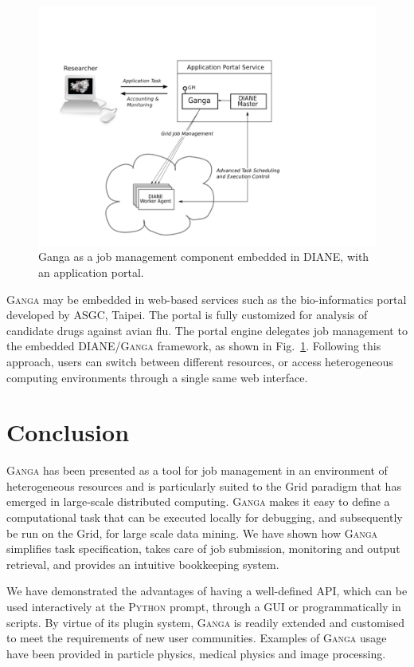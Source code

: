 \documentclass{elsart}
\def\ganga {\textsc{Ganga}\xspace}
\def\python {\textsc{Python}\xspace}
\def\diane {\textsc{DIANE}\xspace}
\def\grid {Grid\xspace}
\begin{document}
\begin{figure}[h!]
  \centering
  \includegraphics[width=1 \textwidth]{ganga-diane-portal}
  \caption{Ganga as a job management component embedded in \diane,
    with an application portal.}
  \label{fig:webportal}
\end{figure}
\ganga may be embedded in web-based services such as the
bio-informatics portal developed by ASGC, Taipei. The portal is fully
customized for analysis of candidate drugs against avian flu.  The portal
engine delegates
job management to the embedded \diane/\ganga framework, as shown in
Fig.~\ref{fig:webportal}. Following this approach, users can
switch between different resources, or access heterogeneous computing environments
through a single same web interface.

\section{Conclusion}
\label{sec:conclusion}
\ganga has been presented as a tool for job management in an environment of heterogeneous resources
and is particularly suited to the \grid paradigm that has emerged in large-scale distributed computing.
\ganga makes it easy to define a
computational task that can be executed locally for debugging, and
subsequently be run on the \grid, for large scale data mining. We have shown how \ganga
simplifies task specification, takes care of job submission, monitoring and
output retrieval, and provides an intuitive bookkeeping system.

We have demonstrated the advantages of having a well-defined API, which can be
used interactively at the \python prompt, through a GUI or
programmatically in scripts. By virtue of its plugin system, \ganga is readily
extended and customised to meet the requirements of new user communities.
Examples of \ganga usage have been provided in particle physics,
medical physics and image processing.
\end{document}
